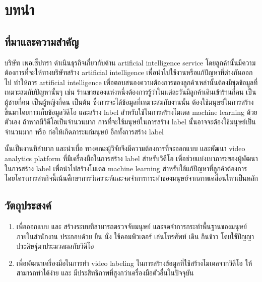 \chapter{บทนำ}
\section{ที่มาและความสำคัญ}
บริษัท เพอเซ็ปทรา ดำเนินธุรกิจเกี่ยวกับด้าน artificial intelligence service โดยลูกค้านั้นมีความต้องการที่จะให้ทางบริษัทสร้าง artificial intelligence เพื่อนำไปใช้งานหรือแก้ปัญหาที่ต่างกันออกไป ทำให้การ artificial intelligence เพื่อตอบสนองความต้องการของลูกค้าเหล่านั้นต้องมีชุดข้อมูลที่เหมาะสมกับปัญหานั้นๆ เช่น ร้านขายของแห่งหนึ่งต้องการรู้ว่าในแต่ละวันมีลูกค้าเดินเข้าร้านกี่คน เป็นผู้ชายกี่คน เป็นผู้หญิงกี่คน เป็นต้น ซึ่งการจะได้ข้อมูลที่เหมาะสมกับงานนั้น ต้องใช้มนุษย์ในการสร้างขึ้นมาโดยการเก็บข้อมูลวิดีโอ และสร้าง label สำหรับใช้ในการสร้างโมเดล machine learning ด้วยตัวเอง ถ้าหากมีวิดีโอเป็นจำนวนมาก การที่จะใช้มนุษย์ในการสร้าง label นั้นอาจจะต้องใช้มนุษย์เป็นจำนวนมาก หรือ ก่อให้เกิดภาระแก่มนุษย์ อีกทั้งการสร้าง label 

นั้นเป็นงานที่ลำบาก และน่าเบื่อ
ทางคณะผู้วิจัยจึงมีความต้องการที่จะออกแบบ และพัฒนา video analytics platform ที่มีเครื่องมือในการสร้าง label สำหรับวิดีโอ เพื่อช่วยแบ่งเบาภาระของผู้พัฒนาในการสร้าง label เพื่อนำไปสร้างโมเดล machine learning สำหรับใช้แก้ปัญหาที่ลูกค้าต้องการ โดยโครงการสหกิจนี้เน้นศึกษาการวิเคราะห์และจดจำการกระทำของมนุษย์จากภาพเคลื่อนไหวเป็นหลัก

\section{วัตถุประสงค์}
\begin{enumerate}
	\setlength\itemsep{-0.25em}
	\item เพื่อออกแบบ และ สร้างระบบที่สามารถตรวจจับมนุษย์ และจดจำการกระทำพื้นฐานของมนุษย์ภายในสำนักงาน ประกอบด้วย ยืน นั่ง ใช้คอมพิวเตอร์ เล่นโทรศัพท์ เดิน กินข้าว โดยใช้ปัญญาประดิษฐ์มาประมวลผลกับวิดีโอ
	\item เพื่อพัฒนาเครื่องมือในการทำ video labeling ในการสร้างข้อมูลที่ใช้สร้างโมเดลจากวิดีโอ ให้สามารถทำได้ง่าย และ มีประสิทธิภาพที่สูงกว่าเครื่องมือตัวอื่นในปัจจุบัน
\end{enumerate}


